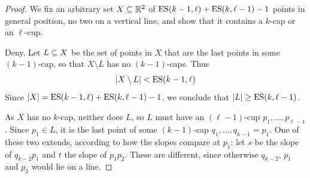 \begin{proof}
    We fix an arbitrary set $X \subseteq \mathbb{R}^2$ of $\operatorname{ES}(k - 1, \ell) + \operatorname{ES}(k, \ell - 1) - 1$ points in general position, no two on a vertical line, and show that it contains a $k$-cap or an $\ell$-cup.
    
    Deny. Let $L \subseteq X$ be the set of points in $X$ that are the last points in some $(k - 1)$-cap, so that $X \setminus L$ has no $(k - 1)$-caps. Thus
    \begin{align*}
        \left\lvert X \setminus L \right\rvert < \operatorname{ES}(k - 1, \ell)
    \end{align*}
    Since $\left\lvert X \right\rvert = \operatorname{ES}(k - 1, \ell) + \operatorname{ES}(k, \ell - 1) - 1$, we conclude that $\left\lvert L \right\rvert \geq \operatorname{ES}(k, \ell - 1)$.

    As $X$ has no $k$-cap, neither does $L$, so $L$ must have an $(\ell - 1)$-cup $p_1, \ldots, p_{\ell - 1}$. Since $p_1 \in L$, it is the last point of some $(k - 1)$-cap $q_1, \ldots, q_{k - 1} = p_1$. One of these two extends, according to how the slopes compare at $p_1$: let $s$ be the slope of $q_{k - 2} p_1$ and $t$ the slope of $p_1 p_2$. These are different, since otherwise $q_{k - 2}$, $p_1$ and $p_2$ would lie on a line.


\end{proof}
